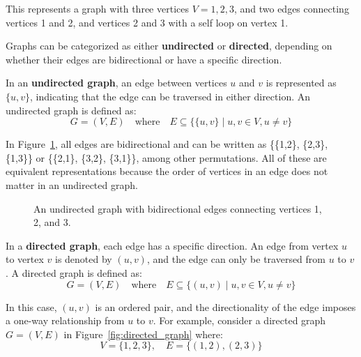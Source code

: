 This represents a graph with three vertices $V = 1, 2, 3$, and two edges connecting vertices 1 and 2, and vertices 2 and 3 with a self loop on vertex 1.\cite{yadav2023advanced, cormen2009introduction}

Graphs can be categorized as either \textbf{undirected} or \textbf{directed}, depending on whether their edges are bidirectional or have a specific direction. 

In an \textbf{undirected graph}, an edge between vertices \( u \) and \( v \) is represented as \( \{u, v\} \), indicating that the edge can be traversed in either direction. An undirected graph is defined as:
\[
G = (V, E) \quad \text{where} \quad E \subseteq \{\{u, v\} \mid u, v \in V, u \neq v \}
\]

In Figure~\ref{fig:undirected_graph}, all edges are bidirectional and can be written as \{\{1,2\}, \{2,3\}, \{1,3\}\} or \{\{2,1\}, \{3,2\}, \{3,1\}\}, among other permutations. All of these are equivalent representations because the order of vertices in an edge does not matter in an undirected graph.

\begin{figure}[h]
\begin{center}
\caption{An undirected graph with bidirectional edges connecting vertices 1, 2, and 3.}
\label{fig:undirected_graph}
\end{center}
\end{figure}

In a \textbf{directed graph}, each edge has a specific direction. An edge from vertex \( u \) to vertex \( v \) is denoted by \( (u, v) \), and the edge can only be traversed from \( u \) to \( v \). A directed graph is defined as:
\[
G = (V, E) \quad \text{where} \quad E \subseteq \{(u, v) \mid u, v \in V, u \neq v \}
\]

In this case, \( (u, v) \) is an ordered pair, and the directionality of the edge imposes a one-way relationship from \( u \) to \( v \). For example, consider a directed graph \( G = (V, E) \) in Figure~\ref{fig:directed_graph} where:
\[
V = \{1, 2, 3\}, \quad E = \{(1, 2), (2, 3)\}
\]

